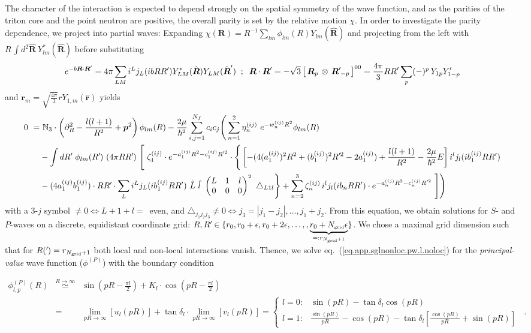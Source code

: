 \documentclass[aps,onecolumn,preprintnumbers,amsmath,amssymb,nofootinbib,superscriptaddress,notitlepage]{revtex4-1}
\newcommand{\eref}[1]{eq.~(\ref{#1})}
\newcommand{\ve}[1]{\ensuremath{\boldsymbol{#1}}}
\newcommand*{\mprime}{^{\prime}\mkern-1.2mu}
\newcommand{\twomhbs}{\ensuremath \frac{2\mu}{\hbar^2}}
\newcommand{\coup}[3]{\left[\,#1\,\otimes\,#2\,\right]^{#3}}
\newcommand{\threej}[6]{ \begin{pmatrix}
   #1 & #2 & #3 \\
   #4 & #5 & #6 
  \end{pmatrix}}
\begin{document}
The character of the interaction is expected to depend strongly on the spatial symmetry of the wave function, and as
the parities of the triton core and the point neutron are positive, the overall parity is set by the relative motion
$\chi$. In order to investigate the parity dependence, we project into partial waves:
Expanding $\chi(\ve{R})=R^{-1}\sum_{lm}\phi_{lm}(R)Y_{lm}(\hat{\ve{R}})$
and projecting from the left with
$R\,\int d^2\hat{\ve{R}}~Y^*_{lm}(\hat{\ve{R}})$
before substituting
$$
e^{-b\ve{R}\cdot\ve{R}'}=4\pi\sum_{LM}i^Lj_L(ib RR')Y^*_{LM}(\hat{\ve{R}})Y_{LM}(\hat{\ve{R}}')\;\;;\;\;
\ve{R}\cdot\ve{R}'=-\sqrt{3}\coup{\ve{R}_p}{\ve{R}\mprime_{-p}}{00}=\frac{4\pi}{3}RR'\sum_p(-)^p\,Y_{1p}Y'_{1-p}
$$
and $\ve{r}_m=\sqrt{\frac{4\pi}{3}}rY_{1,m}(\hat{\ve{r}})$
yields
\begin{align}
0~=&
~\mathbb{N}_3\cdot\left(\partial^2_R-\frac{l(l+1)}{R^2}+\ve{p}^2\right)
\phi_{lm}(R)
-
\twomhbs\sum_{i,j=1}^{N_f}c_ic_j\Bigg(
\sum_{n=1}^2\eta^{(ij)}_n~e^{-w^{(ij)}_nR^2}\phi_{lm}(R)\nonumber\\
%
&-\int dR\mprime~\phi_{lm}(R\mprime)~(4\pi RR\mprime )~\Bigg[
%
~\zeta^{(ij)}_1 \cdot e^{-a^{(ij)}_1R^2-c^{(ij)}_1R'^2}\cdot\Bigg\lbrace
\left[-(4(a^{(ij)}_1)^2R^2+(b^{(ij)}_1)^2R\mprime^2-2a^{(ij)}_1)+\frac{l(l+1)}{R^2}-\frac{2\mu}{\hbar^2}E\right]
 i^l j_{l}(ib^{(ij)}_1 RR')\nonumber\\
%
&-(4a^{(ij)}_1b^{(ij)}_1)\cdot RR\mprime\cdot
\sum_Li^Lj_L(ib^{(ij)}_1 RR')~\hat{L}~\hat{l}~\threej{L}{1}{l}{0}{0}{0}^2~\triangle_{L1l}\Bigg\rbrace
%
+\sum_{n=2}^3\zeta^{(ij)}_n\,i^l j_l(ib_n RR')\cdot 
e^{-a^{(ij)}_nR^2-c^{(ij)}_nR'^2}~\Bigg]\Bigg)\label{eq.app.sglnonloc.pw.l.noloc}
\end{align}
with a 3-$j$ symbol $\neq0\Leftrightarrow L+1+l=$~even, and $\triangle_{j_1j_2j_3}\neq0\Leftrightarrow j_3=|j_1-j_2|,\ldots,j_1+j_2$.
From this equation, we obtain solutions for $S$- and $P$-waves on a discrete, equidistant coordinate grid:
$R,R\mprime\in\lbrace r_0,r_0+\epsilon,r_0+2\epsilon,\ldots,,\underbrace{r_0+N_\text{\tiny grid}\epsilon}_{=:r_{N_\text{\tiny grid}+1}}\rbrace$.
We chose a maximal grid dimension such that for $R(\mprime)=r_{N_\text{\tiny grid}+1}$ both local and non-local interactions
vanish. Thence, we solve \eref{eq.app.sglnonloc.pw.l.noloc} for the {\it principal-value} wave function ($\phi^{(P)}$)
with the boundary condition

\begin{eqnarray}\label{eq.app.principal.value.wfkt}
\phi_{l,p}^{(P)}(R)
&
\stackrel{R\to\infty}{\simeq}
&
\sin\left(pR-\frac{\pi l}{2}\right)
+
K_l
\cdot
\cos\left(pR-\frac{\pi l}{2}\right)\\
&
=
&
\lim_{pR\to\infty}\left[u_l(pR)\right]
+
\tan\delta_l
\cdot
\lim_{pR\to\infty}\left[v_l(pR)\right]
=
\left\lbrace
\begin{array}{ll}
l=0:& \sin\left(pR\right)-\tan\delta_l\cos\left(pR\right)\\
l=1:& \frac{\sin\left(pR\right)}{pR}-\cos\left(pR\right)-\tan\delta_l\left[\frac{\cos\left(pR\right)}{pR}+\sin\left(pR\right)\right]
\end{array}
\right.
\;\;.
\quad
\end{eqnarray}
\end{document}
